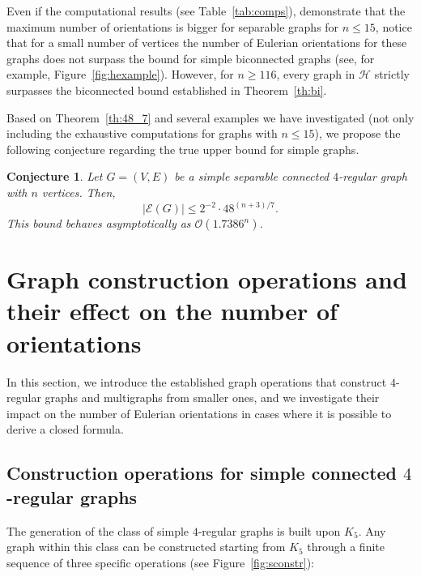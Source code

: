 \documentclass{article}
\newtheorem{conjecture}{Conjecture}
\begin{document}
        Even if the computational results (see Table~\ref{tab:comps}), demonstrate that the maximum number of orientations is bigger for separable graphs for $n\leq 15$, notice that for a small number of vertices the number of Eulerian orientations for these graphs does not surpass the bound for simple biconnected graphs (see, for example, Figure~\ref{fig:hexample}).
        However, for $n \geq 116$, every graph in $\mathcal{H}$ strictly surpasses the biconnected bound established in Theorem~\ref{th:bi}.
        
        Based on Theorem~\ref{th:48_7} and several examples we have investigated (not only including the exhaustive computations for graphs with $n\leq 15$), we propose the following conjecture regarding the true upper bound for simple graphs.
        
        \begin{conjecture}\label{con:simple}
            Let $G=(V,E)$ be a simple separable connected $4$-regular graph with $n$ vertices.
            Then, 
            $$ |\mathcal{E}(G)| \leq 2^{-2}\cdot 48^{(n+3)/7}. $$
            This bound behaves asymptotically as $\mathcal{O}(1.7386^n)$.
        \end{conjecture}
        
    \section{Graph construction operations and their effect on the number of orientations}\label{sec:constr}

        In this section, we introduce the established graph operations that construct $4$-regular graphs and multigraphs from smaller ones, and we investigate their impact on the number of Eulerian orientations in cases where it is possible to derive a closed formula.

    \subsection{Construction operations for simple connected \texorpdfstring{$4$}{4}-regular graphs}

        The generation of the class of simple $4$-regular graphs is built upon $K_5$. 
        Any graph within this class can be constructed starting from $K_5$ through a finite sequence of three specific operations (see Figure~\ref{fig:sconstr}):
\end{document}
